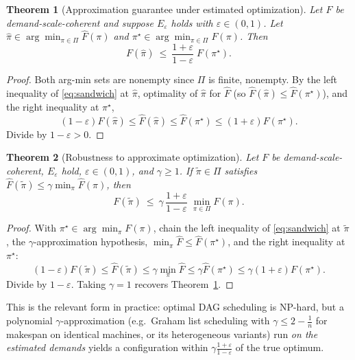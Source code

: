 \documentclass{amsart}
\newtheorem{theorem}{Theorem}
\theoremstyle{definition}
\begin{document}
\begin{theorem}[Approximation guarantee under estimated optimization]\label{thm:main}
Let $F$ be demand-scale-coherent and suppose $E_\varepsilon$ holds with
$\varepsilon\in(0,1)$. Let
$\hat\pi\in\arg\min_{\pi\in\Pi}\widehat F(\pi)$ and
$\pi^\star\in\arg\min_{\pi\in\Pi}F(\pi)$. Then
\begin{equation}\label{eq:approx}
F(\hat\pi)\ \le\ \frac{1+\varepsilon}{1-\varepsilon}\;F(\pi^\star).
\end{equation}
\end{theorem}

\begin{proof}
Both arg-min sets are nonempty since $\Pi$ is finite, nonempty. By the left
inequality of \eqref{eq:sandwich} at $\hat\pi$, optimality of $\hat\pi$ for
$\widehat F$ (so $\widehat F(\hat\pi)\le\widehat F(\pi^\star)$), and the right
inequality at $\pi^\star$,
\[
(1-\varepsilon)F(\hat\pi)\le\widehat F(\hat\pi)\le\widehat F(\pi^\star)
\le(1+\varepsilon)F(\pi^\star).
\]
Divide by $1-\varepsilon>0$.
\end{proof}

\begin{theorem}[Robustness to approximate optimization]\label{thm:approxalg}
Let $F$ be demand-scale-coherent, $E_\varepsilon$ hold, $\varepsilon\in(0,1)$,
and $\gamma\ge1$. If $\tilde\pi\in\Pi$ satisfies
$\widehat F(\tilde\pi)\le\gamma\min_{\pi}\widehat F(\pi)$, then
\begin{equation}\label{eq:approxalg}
F(\tilde\pi)\ \le\ \gamma\,\frac{1+\varepsilon}{1-\varepsilon}\;\min_{\pi\in\Pi}F(\pi).
\end{equation}
\end{theorem}

\begin{proof}
With $\pi^\star\in\arg\min_\pi F(\pi)$, chain the left inequality of
\eqref{eq:sandwich} at $\tilde\pi$, the $\gamma$-approximation hypothesis,
$\min_\pi\widehat F\le\widehat F(\pi^\star)$, and the right inequality at
$\pi^\star$:
\[
(1-\varepsilon)F(\tilde\pi)\le\widehat F(\tilde\pi)\le\gamma\min_\pi\widehat F
\le\gamma\widehat F(\pi^\star)\le\gamma(1+\varepsilon)F(\pi^\star).
\]
Divide by $1-\varepsilon$. Taking $\gamma=1$ recovers Theorem~\ref{thm:main}.
\end{proof}

This is the relevant form in practice: optimal DAG scheduling is NP-hard, but a
polynomial $\gamma$-approximation (e.g.\ Graham list scheduling with
$\gamma\le 2-\tfrac1n$ for makespan on identical machines, or its heterogeneous
variants) run \emph{on the estimated demands} yields a configuration within
$\gamma\frac{1+\varepsilon}{1-\varepsilon}$ of the true optimum.
\end{document}
